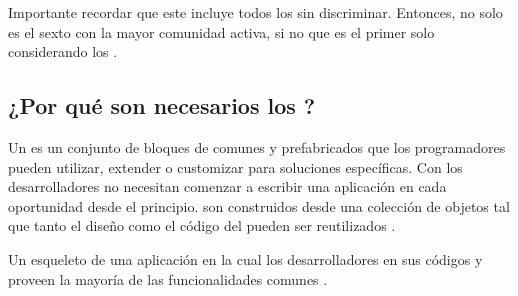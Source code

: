 



Importante recordar que este \rankingCPT incluye todos los \frameworksPC sin discriminar. Entonces, no solo es el sexto \frameworkPC con la mayor comunidad activa, si no que es el primer solo considerando los \frameworkPC \javaScriptNAME \isomorphicAS.

\subsection{ ¿Por qué son necesarios los \frameworksPC?}

Un \frameworkPC es un conjunto de bloques de \softwarePC comunes y prefabricados que los programadores pueden utilizar, extender o customizar para soluciones específicas. Con  \frameworksPC los desarrolladores no necesitan comenzar a escribir una aplicación en cada oportunidad desde el principio. \frameworksPC son construidos desde una colección de objetos tal que tanto el diseño como el código del \frameworkPC pueden ser reutilizados \cite{online_frontier_what_is_framework}.

Un esqueleto de una aplicación en la cual los desarrolladores \plugAS en sus códigos y proveen la mayoría de las funcionalidades comunes \cite{book_addisonwesley_what_is_framework}.

